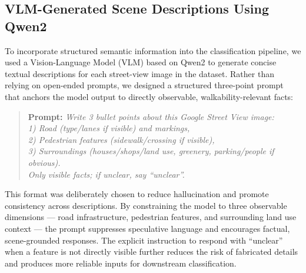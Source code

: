 \documentclass[11pt]{article}
\begin{document}





\subsection{VLM-Generated Scene Descriptions Using Qwen2}

To incorporate structured semantic information into the classification pipeline, we used a Vision-Language Model (VLM) based on Qwen2 to generate concise textual descriptions for each street-view image in the dataset. Rather than relying on open-ended prompts, we designed a structured three-point prompt that anchors the model output to directly observable, walkability-relevant facts:

\begin{quote}
\textbf{Prompt:} \textit{Write 3 bullet points about this Google Street View image:\\
1) Road (type/lanes if visible) and markings,\\
2) Pedestrian features (sidewalk/crossing if visible),\\
3) Surroundings (houses/shops/land use, greenery, parking/people if obvious).\\
Only visible facts; if unclear, say ``unclear''.}
\end{quote}

This format was deliberately chosen to reduce hallucination and promote consistency across descriptions. By constraining the model to three observable dimensions --- road infrastructure, pedestrian features, and surrounding land use context --- the prompt suppresses speculative language and encourages factual, scene-grounded responses. The explicit instruction to respond with ``unclear'' when a feature is not directly visible further reduces the risk of fabricated details and produces more reliable inputs for downstream classification.
\end{document}
